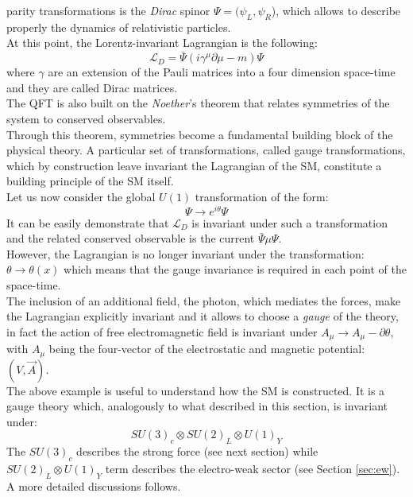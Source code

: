parity transformations is the \textit{Dirac} spinor $\Psi = (\psi_{L},\psi_{R}$), which allows to describe properly the dynamics of relativistic particles.
\vspace{\baselineskip}
\\At this point, the Lorentz-invariant Lagrangian is the following:
\begin{equation}
	\mathcal{L}_D  =  \bar{\Psi}(i\gamma^{\mu}\partial{\mu}-m)\Psi
\end{equation}
where $\gamma$ are an extension of the Pauli matrices into a four dimension space-time and they are called Dirac matrices.
\vspace{\baselineskip}
\\The QFT is also built on the \textit{Noether}’s theorem that relates symmetries of the system to conserved observables.\\
Through this theorem, symmetries become a fundamental building block of the physical theory. 
A particular set of transformations, called gauge transformations, which by construction leave invariant the Lagrangian of the SM, 
constitute a building principle of the SM itself. 
\vspace{\baselineskip}
\\Let us now consider the global $U(1)$\footnotemark {}
transformation of the form: 
\begin{equation}
	\Psi \rightarrow e^{i\theta}\Psi
\end{equation}
It can be easily  demonstrate that $\mathcal{L}_D$ is invariant under such a transformation and the related conserved observable is
the current $\bar{\Psi}\mu\Psi$. \\
However, the Lagrangian is no longer invariant under the transformation: $\theta\rightarrow\theta (x)$ which means that the gauge 
invariance is required in each point of the space-time.
\\The inclusion of an additional field, the photon, which mediates the forces, make the Lagrangian explicitly invariant and it allows
to choose a \textit{gauge} of the theory, in fact the action of free electromagnetic field is invariant under $A_{\mu}\rightarrow A_{\mu}-\partial\theta$,
with $A_{\mu}$ being the four-vector of the electrostatic and magnetic potential: $(V,\vec{A})$.
\vspace{\baselineskip}
\\The above example is useful to understand how the SM is constructed. It is a gauge theory which, analogously to what described in
this section, is invariant under:
\begin{equation} 
	SU(3)_{c} \otimes SU(2)_{L} \otimes U(1)_{Y}
\end{equation}
The $SU(3)_{c}$ describes the strong force (see next section) while $SU(2)_{L} \otimes U(1)_{Y}$ term describes the electro-weak sector (see Section \ref{sec:ew}). 
A more detailed discussions follows.

